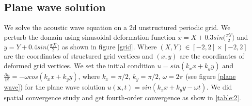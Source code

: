 \documentclass[12pt]{article}
\begin{document}
\subsection*{Plane wave solution}
We solve the acoustic wave equation on a 2d unstructured periodic grid. We perturb the domain using sinusoidal deformation function $x = X + 0.3sin\Big(\frac{\pi Y}{2}\Big)$ and $y = Y + 0.4sin\Big(\frac{\pi X}{2}\Big)$ as shown in figure \ref{grid}. Where $(X,Y) \in [-2,2] \times [-2,2] $ are the coordinates of structured grid vertices and $(x,y)$ are the coordinates of deformed grid vertices. We set the initial condition $u = sin(k_{x}x + k_{y}y)$ and
$\frac{\partial u}{\partial t} = -\omega cos(k_{x}x + k_{y}y)$,
where $k_{x} = {\pi}/{2}$, $k_{y} = {\pi}/{2}$, $\omega = 2\pi$ (see figure \ref{plane wave}) for the plane wave solution $u(\mathbf{x},t)=sin(k_{x}x + k_{y}y - \omega t)$. We did spatial convergence study and get fourth-order convergence as show in \ref{table:2}. 
\end{document}
